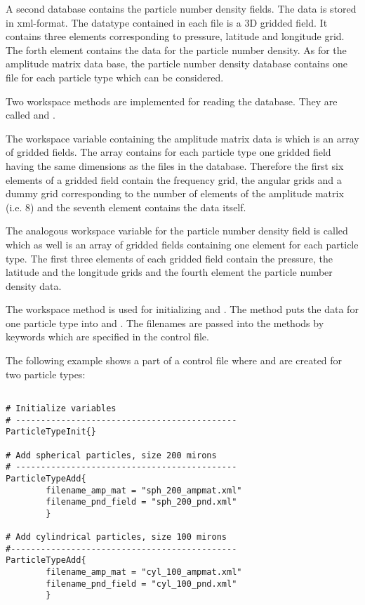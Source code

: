 \label{sec:scattering:pnd_data}

A second database contains the particle number density fields. The
data is stored in xml-format. The datatype contained in each file is a
3D gridded field. It contains three elements corresponding to 
pressure, latitude and longitude grid. The forth element contains the
data for the particle number density. As for the amplitude matrix data
base, the particle number density database contains one file for each
particle type which can be considered.

\label{sec:scattering:read_data}

Two workspace methods are implemented for reading the database. They
are called  and . 

The workspace variable containing the amplitude matrix data is
 which is an array of gridded fields. The
array contains for each particle type one gridded field having the
same dimensions as the files in the database. Therefore the first six
elements of a gridded field contain the
frequency grid, the angular grids and a dummy grid corresponding
to the number of
elements of the amplitude matrix (i.e. 8) and the seventh element 
contains the data itself.

The analogous workspace variable for the particle number density
field is called  which as well is an array of
gridded fields containing one element for each particle type. The
first three elements of each gridded field contain the pressure, the
latitude and the longitude grids and the fourth element the particle
number density data. 

The workspace method  is used for initializing
 and . 
The method  puts the data for one particle
type into  and . The
filenames are passed into the methods by keywords which are specified
in the control file.

The following example shows a part of a control file where
 and   are created
for two particle types:

\begin{verbatim}

# Initialize variables
# --------------------------------------------
ParticleTypeInit{}

# Add spherical particles, size 200 mirons
# --------------------------------------------
ParticleTypeAdd{
        filename_amp_mat = "sph_200_ampmat.xml" 
        filename_pnd_field = "sph_200_pnd.xml"
        }       

# Add cylindrical particles, size 100 mirons
#---------------------------------------------
ParticleTypeAdd{
        filename_amp_mat = "cyl_100_ampmat.xml" 
        filename_pnd_field = "cyl_100_pnd.xml"
        }   

\end{verbatim}
 
